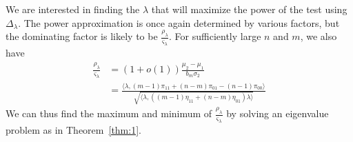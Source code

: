 \documentclass[draftcls]{IEEEtran}
\theoremstyle{definition}
\begin{document}
We are interested in finding the $\lambda$ that will maximize the
power of the test using $\Delta_{\lambda}$. The power approximation is
once again determined by various factors, but the dominating factor is
likely to be $\tfrac{\rho_\lambda}{\varsigma_\lambda}$. For sufficiently large $n$
and $m$, we also have
\begin{equation*}
  \begin{split}
  \frac{\rho_\lambda}{\varsigma_\lambda} &= (1 + o(1)) \frac{\mu_2 - \mu_1}{b_m
    \sigma_ 2} \\ &= \frac{\langle \lambda, (m-1)\pi_{11} + (n-m)\pi_{01} -
    (n-1) \pi_{00} \rangle}{\sqrt{\langle \lambda, ((m-1) \eta_{11} +
    (n-m)\eta_{01}) \lambda \rangle}}
  \end{split}
\end{equation*}
We can thus find the maximum and minimum of
$\tfrac{\rho_{\lambda}}{\varsigma_{\lambda}}$ by solving an 
eigenvalue problem as in Theorem~\ref{thm:1}. 
\end{document}

